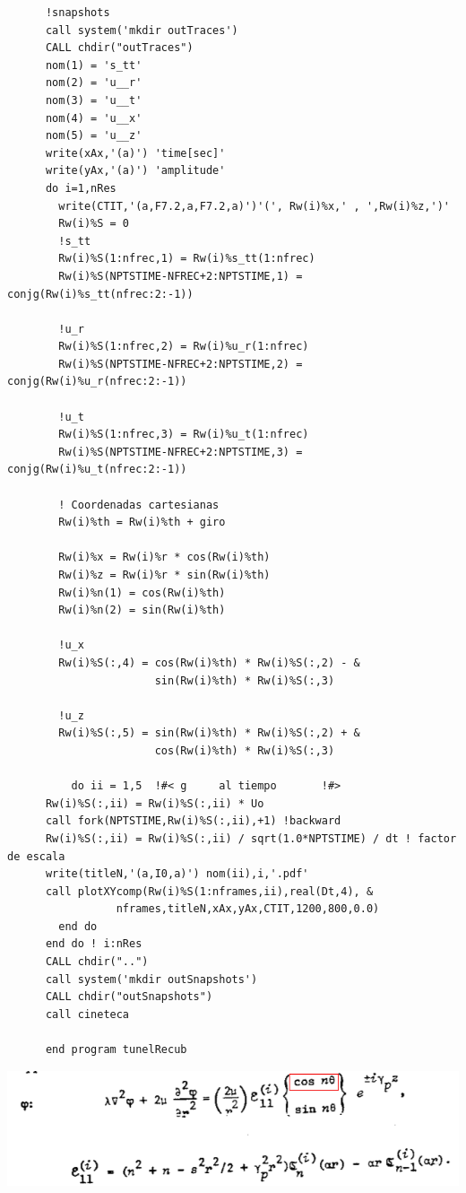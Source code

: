 \documentclass [11pt,spanish]{article}
\begin{document}
\begingroup
\fontsize{10pt}{12pt}
\selectfont
{}
\begin{shaded}
\begin{verbatim}
      !snapshots 
      call system('mkdir outTraces')
      CALL chdir("outTraces")  
      nom(1) = 's_tt'
      nom(2) = 'u__r'
      nom(3) = 'u__t'
      nom(4) = 'u__x'
      nom(5) = 'u__z'
      write(xAx,'(a)') 'time[sec]'
      write(yAx,'(a)') 'amplitude'
      do i=1,nRes
        write(CTIT,'(a,F7.2,a,F7.2,a)')'(', Rw(i)%x,' , ',Rw(i)%z,')'
        Rw(i)%S = 0
        !s_tt
        Rw(i)%S(1:nfrec,1) = Rw(i)%s_tt(1:nfrec)
        Rw(i)%S(NPTSTIME-NFREC+2:NPTSTIME,1) = conjg(Rw(i)%s_tt(nfrec:2:-1)) 
        
        !u_r
        Rw(i)%S(1:nfrec,2) = Rw(i)%u_r(1:nfrec)
        Rw(i)%S(NPTSTIME-NFREC+2:NPTSTIME,2) = conjg(Rw(i)%u_r(nfrec:2:-1)) 
        
        !u_t
        Rw(i)%S(1:nfrec,3) = Rw(i)%u_t(1:nfrec)
        Rw(i)%S(NPTSTIME-NFREC+2:NPTSTIME,3) = conjg(Rw(i)%u_t(nfrec:2:-1)) 
        
        ! Coordenadas cartesianas
        Rw(i)%th = Rw(i)%th + giro
        
        Rw(i)%x = Rw(i)%r * cos(Rw(i)%th)
        Rw(i)%z = Rw(i)%r * sin(Rw(i)%th)
        Rw(i)%n(1) = cos(Rw(i)%th)
        Rw(i)%n(2) = sin(Rw(i)%th)
        
        !u_x
        Rw(i)%S(:,4) = cos(Rw(i)%th) * Rw(i)%S(:,2) - &
                       sin(Rw(i)%th) * Rw(i)%S(:,3)
        
        !u_z
        Rw(i)%S(:,5) = sin(Rw(i)%th) * Rw(i)%S(:,2) + &
                       cos(Rw(i)%th) * Rw(i)%S(:,3)
        
          do ii = 1,5  !#< g     al tiempo       !#>
      Rw(i)%S(:,ii) = Rw(i)%S(:,ii) * Uo
      call fork(NPTSTIME,Rw(i)%S(:,ii),+1) !backward
      Rw(i)%S(:,ii) = Rw(i)%S(:,ii) / sqrt(1.0*NPTSTIME) / dt ! factor de escala
      write(titleN,'(a,I0,a)') nom(ii),i,'.pdf'
      call plotXYcomp(Rw(i)%S(1:nframes,ii),real(Dt,4), & 
                 nframes,titleN,xAx,yAx,CTIT,1200,800,0.0)
        end do
      end do ! i:nRes
      CALL chdir("..")
      call system('mkdir outSnapshots')
      CALL chdir("outSnapshots")
      call cineteca
      
      end program tunelRecub
\end{verbatim}
\end{shaded}
\endgroup
\includegraphics[scale=0.5]{e11}
\end{document}
